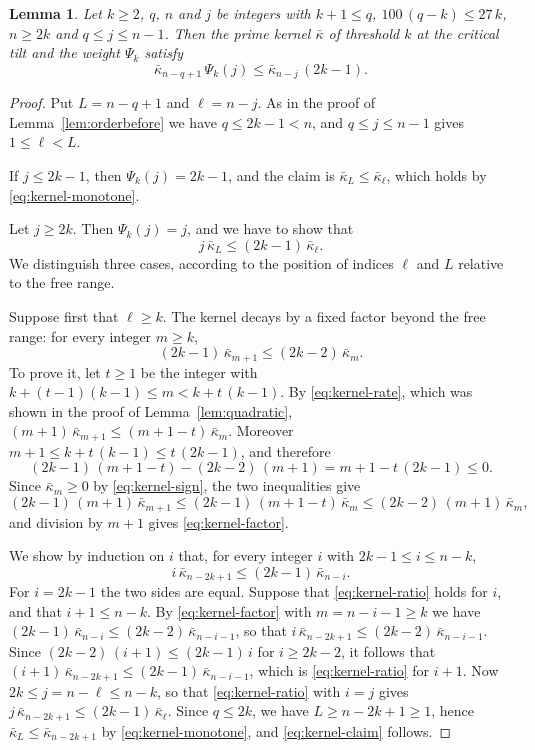 \documentclass{amsart}
\newtheorem{lemma}[theorem]{Lemma}
\theoremstyle{definition}
\theoremstyle{remark}
\numberwithin{equation}{section}
\begin{document}
\begin{lemma}\label{lem:orderafter}
Let $k\ge2$, $q$, $n$ and $j$ be integers with $k+1\le q$,
$100\,(q-k)\le27\,k$, $n\ge2k$ and $q\le j\le n-1$. Then the prime kernel
$\bar\kappa$ of threshold $k$ at the critical tilt and the weight $\Psi_k$
satisfy
\[
\bar\kappa_{n-q+1}\,\Psi_k(j)\le\bar\kappa_{n-j}\,(2k-1) .
\]
\end{lemma}

\begin{proof}
Put $L=n-q+1$ and $\ell=n-j$. As in the proof of Lemma~\ref{lem:orderbefore}
we have $q\le2k-1<n$, and $q\le j\le n-1$ gives $1\le\ell<L$.

If $j\le2k-1$, then $\Psi_k(j)=2k-1$, and the claim is
$\bar\kappa_L\le\bar\kappa_\ell$, which holds by \eqref{eq:kernel-monotone}.

Let $j\ge2k$. Then $\Psi_k(j)=j$, and we have to show that
\begin{equation}\label{eq:kernel-claim}
j\,\bar\kappa_L\le(2k-1)\,\bar\kappa_\ell .
\end{equation}
We distinguish three cases, according to the position of indices $\ell$
and $L$ relative to the free range.

Suppose first that $\ell\ge k$. The kernel decays by a fixed factor beyond
the free range: for every integer $m\ge k$,
\begin{equation}\label{eq:kernel-factor}
(2k-1)\,\bar\kappa_{m+1}\le(2k-2)\,\bar\kappa_m .
\end{equation}
To prove it, let $t\ge1$ be the integer with
$k+(t-1)(k-1)\le m<k+t\,(k-1)$. By \eqref{eq:kernel-rate}, which was shown
in the proof of Lemma~\ref{lem:quadratic},
$(m+1)\,\bar\kappa_{m+1}\le(m+1-t)\,\bar\kappa_m$. Moreover
$m+1\le k+t\,(k-1)\le t\,(2k-1)$, and therefore
\[
(2k-1)\,(m+1-t)-(2k-2)\,(m+1)=m+1-t\,(2k-1)\le0 .
\]
Since $\bar\kappa_m\ge0$ by \eqref{eq:kernel-sign}, the two inequalities
give
\[
(2k-1)\,(m+1)\,\bar\kappa_{m+1}\le(2k-1)\,(m+1-t)\,\bar\kappa_m
\le(2k-2)\,(m+1)\,\bar\kappa_m ,
\]
and division by $m+1$ gives \eqref{eq:kernel-factor}.

We show by induction on $i$ that, for every
integer $i$ with $2k-1\le i\le n-k$,
\begin{equation}\label{eq:kernel-ratio}
i\,\bar\kappa_{n-2k+1}\le(2k-1)\,\bar\kappa_{n-i} .
\end{equation}
For $i=2k-1$ the two sides are equal. Suppose that \eqref{eq:kernel-ratio}
holds for $i$, and that $i+1\le n-k$. By \eqref{eq:kernel-factor} with
$m=n-i-1\ge k$ we have
$(2k-1)\,\bar\kappa_{n-i}\le(2k-2)\,\bar\kappa_{n-i-1}$, so that
$i\,\bar\kappa_{n-2k+1}\le(2k-2)\,\bar\kappa_{n-i-1}$. Since
$(2k-2)\,(i+1)\le(2k-1)\,i$ for $i\ge2k-2$, it follows that
$(i+1)\,\bar\kappa_{n-2k+1}\le(2k-1)\,\bar\kappa_{n-i-1}$, which is
\eqref{eq:kernel-ratio} for $i+1$. Now
$2k\le j=n-\ell\le n-k$, so that \eqref{eq:kernel-ratio} with $i=j$ gives
$j\,\bar\kappa_{n-2k+1}\le(2k-1)\,\bar\kappa_\ell$. Since $q\le2k$, we have
$L\ge n-2k+1\ge1$, hence $\bar\kappa_L\le\bar\kappa_{n-2k+1}$ by
\eqref{eq:kernel-monotone}, and \eqref{eq:kernel-claim} follows.


\end{proof}
\end{document}
